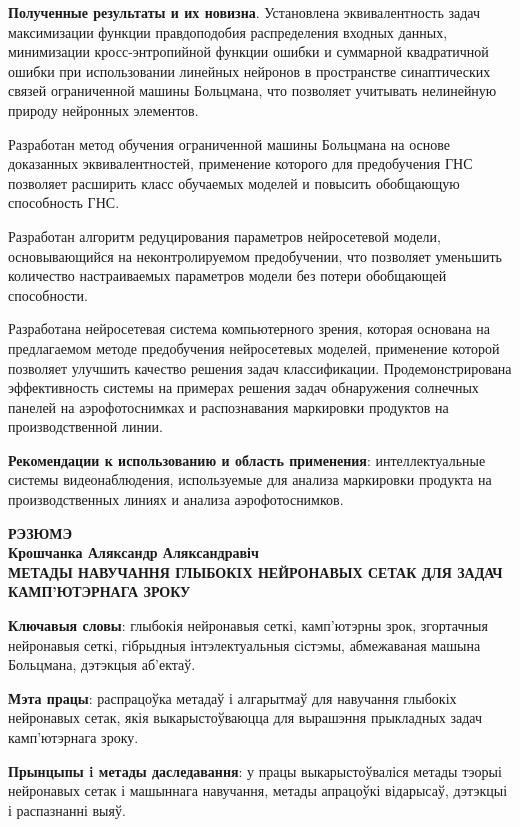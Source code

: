 \documentclass{thesisby}
\begin{document}
\textbf{Полученные результаты и их новизна}.
Установлена эквивалентность задач максимизации функции правдоподобия распределения входных данных, минимизации кросс-энтропийной функции ошибки и суммарной квадратичной ошибки при использовании линейных нейронов в пространстве синаптических связей ограниченной машины Больцмана, что позволяет учитывать нелинейную природу нейронных элементов.

Разработан метод обучения ограниченной машины Больцмана на основе доказанных эквивалентностей, применение которого для предобучения ГНС позволяет расширить класс обучаемых моделей и повысить обобщающую способность ГНС.

Разработан алгоритм редуцирования параметров нейросетевой модели, основывающийся на неконтролируемом предобучении, что позволяет уменьшить количество настраиваемых параметров модели без потери обобщающей способности.

Разработана нейросетевая система компьютерного зрения, которая основана на предлагаемом методе предобучения нейросетевых моделей, применение которой позволяет улучшить качество решения задач классификации. Продемонстрирована эффективность системы на примерах решения задач обнаружения солнечных панелей на аэрофотоснимках и распознавания маркировки продуктов на производственной линии.

\textbf{Рекомендации к использованию и область применения}:
интеллектуальные системы видеонаблюдения, используемые для анализа маркировки продукта на производственных линиях и анализа аэрофотоснимков.

\newpage
\begin{center}
\bf РЭЗЮМЭ\\[1mm]\rm Крошчанка Аляксандр Аляксандравіч\\[1mm] \bf МЕТАДЫ НАВУЧАННЯ ГЛЫБОКIХ НЕЙРОНАВЫХ СЕТАК ДЛЯ ЗАДАЧ КАМП'ЮТЭРНАГА ЗРОКУ
\end{center}

{\bf Ключавыя словы}: глыбокія нейронавыя сеткі, камп'ютэрны зрок, згортачныя нейронавыя сеткі, гібрыдныя інтэлектуальныя сістэмы, абмежаваная машына Больцмана, дэтэкцыя аб'екта\u{у}.

\textbf{Мэта працы}: распрацо\u{у}ка метада\u{у} і алгарытма\u{у} для навучання глыбокіх нейронавых сетак, якія выкарысто\u{у}ваюцца для вырашэння прыкладных задач камп'ютэрнага зроку.

\textbf{Прынцыпы i метады даследавання}: у працы выкарысто\u{у}валіся метады тэорыі нейронавых сетак і машыннага навучання, метады апрацо\u{у}кі відарыса\u{у}, дэтэкцыі і распазнанні выя\u{у}.
\end{document}
